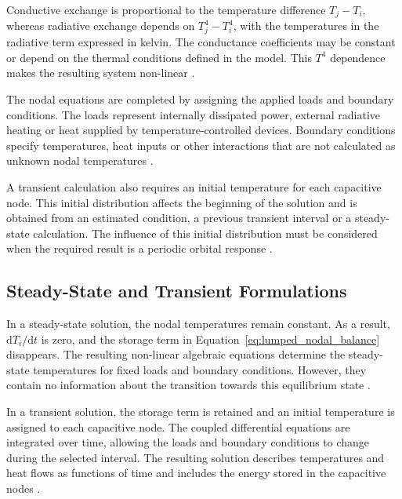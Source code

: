 Conductive exchange is proportional to the temperature difference $T_j-T_i$, whereas radiative exchange 
depends on $T_j^4-T_i^4$, with the temperatures in the radiative term expressed in kelvin. The conductance
coefficients may be constant or depend on the thermal conditions defined in the model. This $T^4$ dependence makes the 
resulting system non-linear \cite{spacethctrl,thermal_eng_man}.

\begin{sloppypar}
The nodal equations are completed by assigning the applied loads and boundary conditions. 
The loads represent internally dissipated power, external radiative heating or heat 
supplied by temperature-controlled devices. Boundary conditions specify temperatures, 
heat inputs or other interactions that are not calculated as unknown nodal temperatures 
\cite{thermal_eng_man,esatan_training_man}.
\end{sloppypar}

A transient calculation also requires an initial temperature for each capacitive node. 
This initial distribution affects the beginning of the solution and is obtained from an 
estimated condition, a previous transient interval or a steady-state calculation. 
The influence of this initial distribution must be considered when the required result 
is a periodic orbital response 
\cite{thermal_eng_man,esatan_training_man}.

\subsection{Steady-State and Transient Formulations}

In a steady-state solution, the nodal temperatures remain constant. As a result, 
$\mathrm{d}T_i/\mathrm{d}t$ is zero, and the storage term in 
Equation~\eqref{eq:lumped_nodal_balance} disappears. The resulting non-linear algebraic 
equations determine the steady-state temperatures for fixed loads and boundary conditions. 
However, they contain no information about the transition towards this equilibrium state 
\cite{spacethctrl,thermal_eng_man}.

In a transient solution, the storage term is retained and an initial temperature is 
assigned to each capacitive node. The coupled differential equations are integrated over 
time, allowing the loads and boundary conditions to change during the selected interval. 
The resulting solution describes temperatures and heat flows as functions of time and 
includes the energy stored in the capacitive nodes 
\cite{spacethctrl,thermal_eng_man}.

